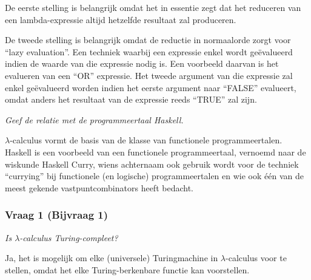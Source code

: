 De eerste stelling is belangrijk omdat het in essentie zegt dat het reduceren van een lambda-expressie altijd hetzelfde resultaat zal produceren.

De tweede stelling is belangrijk omdat de reductie in normaalorde zorgt voor ``lazy evaluation''. Een techniek waarbij een expressie enkel wordt ge\"evalueerd indien de waarde van die expressie nodig is. Een voorbeeld daarvan is het evalueren van een ``OR'' expressie. Het tweede argument van die expressie zal enkel ge\"evalueerd worden indien het eerste argument naar ``FALSE'' evalueert, omdat anders het resultaat van de expressie reeds ``TRUE'' zal zijn.

\textit{Geef de relatie met de programmeertaal Haskell.}

$\lambda$-calculus vormt de basis van de klasse van functionele programmeertalen. Haskell is een voorbeeld van een functionele programmeertaal, vernoemd naar de wiskunde Haskell Curry, wiens achternaam ook gebruik wordt voor de techniek ``currying'' bij functionele (en logische) programmeertalen en wie ook \'e\'en van de meest gekende vastpuntcombinators heeft bedacht.

\subsubsection{Vraag 1 (Bijvraag 1)}

\textit{Is $\lambda$-calculus Turing-compleet?}

Ja, het is mogelijk om elke (universele) Turingmachine in $\lambda$-calculus voor te stellen, omdat het elke Turing-berkenbare functie kan voorstellen.